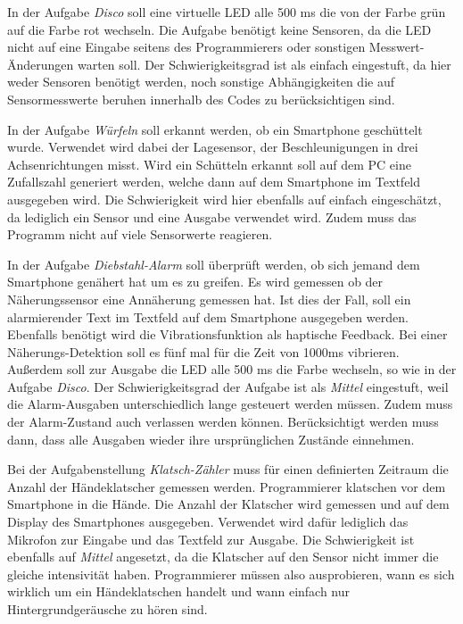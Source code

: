\documentclass[11pt,a4paper]{report}
\begin{document}
In der Aufgabe \textit{Disco} soll eine virtuelle LED alle 500 ms die von der Farbe grün auf die Farbe rot wechseln.
Die Aufgabe benötigt keine Sensoren, da die LED nicht auf eine Eingabe seitens des Programmierers oder sonstigen Messwert-Änderungen warten soll.
Der Schwierigkeitsgrad ist als einfach eingestuft, da hier weder Sensoren benötigt werden, noch sonstige Abhängigkeiten die auf Sensormesswerte beruhen innerhalb des Codes zu berücksichtigen sind.

In der Aufgabe \textit{Würfeln} soll erkannt werden, ob ein Smartphone geschüttelt wurde.
Verwendet wird dabei der Lagesensor, der Beschleunigungen in drei Achsenrichtungen misst.
Wird ein Schütteln erkannt soll auf dem PC eine Zufallszahl generiert werden, welche dann auf dem Smartphone im Textfeld ausgegeben wird.
Die Schwierigkeit wird hier ebenfalls auf einfach eingeschätzt, da lediglich ein Sensor und eine Ausgabe verwendet wird.
Zudem muss das Programm nicht auf viele Sensorwerte reagieren.

In der Aufgabe \textit{Diebstahl-Alarm} soll überprüft werden, ob sich jemand dem Smartphone genähert hat um es zu greifen.
Es wird gemessen ob der Näherungssensor eine Annäherung gemessen hat.
Ist dies der Fall, soll ein alarmierender Text im Textfeld auf dem Smartphone ausgegeben werden.
Ebenfalls benötigt wird die Vibrationsfunktion als haptische Feedback.
Bei einer Näherungs-Detektion soll es fünf mal für die Zeit von 1000ms vibrieren.
Außerdem soll zur Ausgabe die LED alle 500 ms die Farbe wechseln, so wie in der Aufgabe \textit{Disco}.
Der Schwierigkeitsgrad der Aufgabe ist als \textit{Mittel} eingestuft, weil die Alarm-Ausgaben unterschiedlich lange gesteuert werden müssen.
Zudem muss der Alarm-Zustand auch verlassen werden können.
Berücksichtigt werden muss dann, dass alle Ausgaben wieder ihre ursprünglichen Zustände einnehmen.

Bei der Aufgabenstellung \textit{Klatsch-Zähler} muss für einen definierten Zeitraum die Anzahl der Händeklatscher gemessen werden.
Programmierer klatschen vor dem Smartphone in die Hände.
Die Anzahl der Klatscher wird gemessen und auf dem Display des Smartphones ausgegeben.
Verwendet wird dafür lediglich das Mikrofon zur Eingabe und das Textfeld zur Ausgabe.
Die Schwierigkeit ist ebenfalls auf \textit{Mittel} angesetzt, da die Klatscher auf den Sensor nicht immer die gleiche intensivität haben.
Programmierer müssen also ausprobieren, wann es sich wirklich um ein Händeklatschen handelt und wann einfach nur Hintergrundgeräusche zu hören sind.
\end{document}
